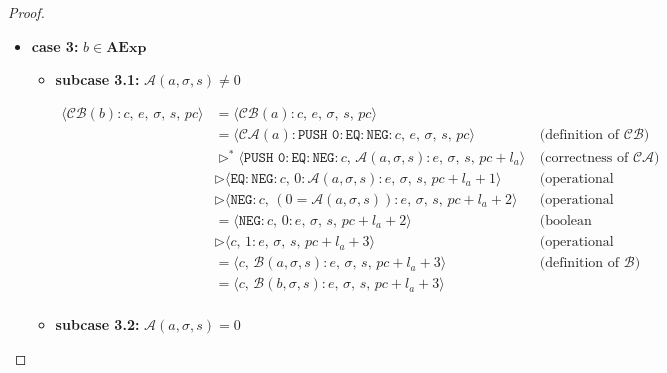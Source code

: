 \documentclass{article}
\begin{document}
\begin{proof}
\begin{itemize}
    \newpage
    \item \textbf{case 3: } $b \in \textbf{AExp}$

     \begin{itemize}
         \item \textbf{subcase 3.1: } $\mathcal{A}(a, \sigma, s) \neq 0$

         \[
          \begin{aligned}
            \langle  \mathcal{CB}(b) : c,\, e,\, \sigma,\, s,\, pc \rangle
            &= \langle \mathcal{CB}(a) : c,\, e,\, \sigma,\, s,\, pc \rangle \\
            &= \langle \mathcal{CA}(a) : \texttt{PUSH 0} : \texttt{EQ} : \texttt{NEG} : c,\, e,\, \sigma,\, s,\, pc \rangle
            && \text{(definition of $\mathcal{CB}$)} \\
            &\triangleright^\ast \langle \texttt{PUSH 0} : \texttt{EQ} : \texttt{NEG} : c,\, \mathcal{A}(a, \sigma, s): e,\, \sigma,\, s,\, pc + l_a \rangle
            && \text{(correctness of $\mathcal{CA}$)} \\
            &\triangleright \langle \texttt{EQ} : \texttt{NEG} :  c,\, 0 : \mathcal{A}(a, \sigma, s): e,\, \sigma,\, s,\, pc + l_a + 1 \rangle
            && \text{(operational semantics)} \\
            &\triangleright \langle \texttt{NEG} : c,\, (0 = \mathcal{A}(a, \sigma, s)) : e,\, \sigma,\, s,\, pc + l_a + 2 \rangle
            && \text{(operational semantics)} \\
            &= \langle \texttt{NEG} : c,\, 0 : e,\, \sigma,\, s,\, pc + l_a + 2 \rangle
            && \text{(boolean algebra)} \\
            &\triangleright \langle c,\, 1 : e,\, \sigma,\, s,\, pc + l_a + 3 \rangle
            && \text{(operational semantics)} \\
            &= \langle c,\, \mathcal{B}(a, \sigma, s) : e,\, \sigma,\, s,\, pc + l_a + 3 \rangle
            && \text{(definition of $\mathcal{B}$)} \\
            &= \langle c,\, \mathcal{B}(b, \sigma, s) : e,\, \sigma,\, s,\, pc + l_a + 3 \rangle
            \\
          \end{aligned}
      \]

         \item \textbf{subcase 3.2: } $\mathcal{A}(a, \sigma, s) = 0$


\end{itemize}
\end{itemize}
\end{proof}
\end{document}
